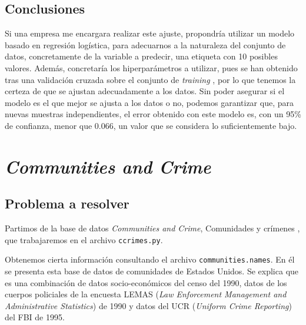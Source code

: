 \documentclass[a4paper, 20pt]{article}
\newcommand{\training}{\textit{training }}
\begin{document}
{\subsection{Conclusiones}
Si una empresa me encargara realizar este ajuste, propondría utilizar un modelo basado en regresión logística, para adecuarnos a la naturaleza del conjunto de datos, concretamente de la variable a predecir, una etiqueta con 10 posibles valores. Además, concretaría los hiperparámetros a utilizar, pues se han obtenido tras una validación cruzada sobre el conjunto de \training, por lo que tenemos la certeza de que se ajustan adecuadamente a los datos. Sin poder asegurar si el modelo es el que mejor se ajusta a los datos o no, podemos garantizar que, para nuevas muestras independientes, el error obtenido con este modelo es, con un 95\% de confianza, menor que 0.066, un valor que se considera lo suficientemente bajo.
\newpage

\section{\textit{Communities and Crime}}

\subsection{Problema a resolver}

Partimos de la base de datos \textit{Communities and Crime}, Comunidades y crímenes \cite{com_uci}, que trabajaremos en el archivo \texttt{ccrimes.py}.

Obtenemos cierta información consultando el archivo \texttt{communities.names}. En él se presenta esta base de datos de comunidades de Estados Unidos. Se explica que es una combinación de datos socio-económicos del censo del 1990, datos de los cuerpos policiales de la encuesta LEMAS (\textit{Law Enforcement Management and Administrative Statistics}) de 1990 y datos del UCR (\textit{Uniform Crime Reporting}) del FBI de 1995.

}
\end{document}
